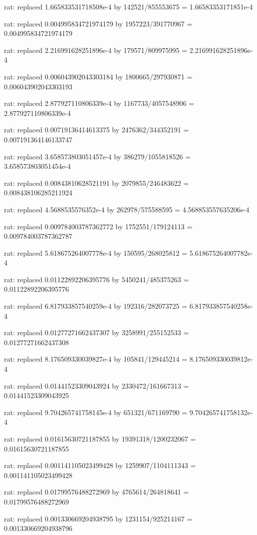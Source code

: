 \documentclass[a4paper,10pt]{article}
\begin{document}
\begin{eulernotebook}
\begin{eulercomment}
\begin{eulercomment}
\begin{eulercomment}
\begin{eulercomment}
\begin{eulercomment}
\begin{eulercomment}
\begin{eulercomment}
\begin{eulercomment}
\begin{eulercomment}
\begin{eulercomment}
\begin{eulercomment}
\begin{eulercomment}
\begin{eulercomment}
\begin{eulercomment}
\begin{eulercomment}
\begin{eulercomment}
\begin{euleroutput}
  rat: replaced 1.665833531718508e-4 by 142521/855553675 = 1.66583353171851e-4
  
  rat: replaced 0.004995834721974179 by 1957223/391770967 = 0.004995834721974179
  
  rat: replaced 2.216991628251896e-4 by 179571/809975995 = 2.216991628251896e-4
  
  rat: replaced 0.006043902043303184 by 1800665/297930871 = 0.006043902043303193
  
  rat: replaced 2.877927110806339e-4 by 1167733/4057548906 = 2.877927110806339e-4
  
  rat: replaced 0.00719136414613375 by 2476362/344352191 = 0.007191364146133747
  
  rat: replaced 3.658573803051457e-4 by 386279/1055818526 = 3.658573803051454e-4
  
  rat: replaced 0.00843810628521191 by 2079855/246483622 = 0.008438106285211924
  
  rat: replaced 4.5688535576352e-4 by 262978/575588595 = 4.568853557635206e-4
  
  rat: replaced 0.009784003787362772 by 1752551/179124113 = 0.009784003787362787
  
  rat: replaced 5.618675264007778e-4 by 150595/268025812 = 5.618675264007782e-4
  
  rat: replaced 0.01122892206395776 by 5450241/485375263 = 0.01122892206395776
  
  rat: replaced 6.817933857540259e-4 by 192316/282073725 = 6.817933857540258e-4
  
  rat: replaced 0.01277271662437307 by 3258991/255152533 = 0.01277271662437308
  
  rat: replaced 8.176509330039827e-4 by 105841/129445214 = 8.176509330039812e-4
  
  rat: replaced 0.01441523309043924 by 2330472/161667313 = 0.01441523309043925
  
  rat: replaced 9.704265741758145e-4 by 651321/671169790 = 9.704265741758132e-4
  
  rat: replaced 0.01615630721187855 by 19391318/1200232067 = 0.01615630721187855
  
  rat: replaced 0.001141105023499428 by 1259907/1104111343 = 0.001141105023499428
  
  rat: replaced 0.01799576488272969 by 4765614/264818641 = 0.01799576488272969
  
  rat: replaced 0.001330669204938795 by 1231154/925214167 = 0.001330669204938796
  

\end{euleroutput}
\end{eulercomment}
\end{eulercomment}
\end{eulercomment}
\end{eulercomment}
\end{eulercomment}
\end{eulercomment}
\end{eulercomment}
\end{eulercomment}
\end{eulercomment}
\end{eulercomment}
\end{eulercomment}
\end{eulercomment}
\end{eulercomment}
\end{eulercomment}
\end{eulercomment}
\end{eulercomment}
\end{eulernotebook}
\end{document}
